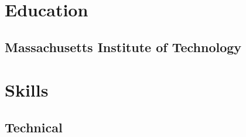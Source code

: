 \documentclass[letterpaper, article]{deedy-resume-openfont}
\begin{document}
\hfill
%
%
\begin{minipage}[t]{0.33\textwidth}

\vspace{\topsep}


\section{Education}

\subsection{Massachusetts Institute of Technology \hfill}
\sectionsep





\section{Skills}
\subsection{Technical}


\end{minipage}
\end{document}
